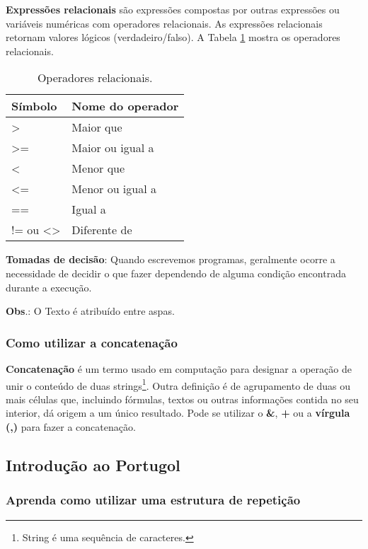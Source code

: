 \documentclass[12pt,a4paper]{article}
\begin{document}
	\textbf{Expressões relacionais} são expressões compostas por outras expressões ou variáveis numéricas com operadores relacionais. As expressões relacionais retornam valores lógicos (verdadeiro/falso). A Tabela \ref{tab:OperadoresRelacionais} mostra os operadores relacionais.
	
	\begin{table}[!htpb]
		\centering
		\begin{tabular}{|p{}|p{}|}%
			\hline
			Símbolo & Nome do operador \\
			\hline
			> & Maior que \\
			\hline
			>= & Maior ou igual a \\
			\hline
			< & Menor que \\
			\hline
			<= & Menor ou igual a \\
			\hline
			== & Igual a \\
			\hline
			!= ou <> & Diferente de \\
			\hline
		\end{tabular}
		\caption{Operadores relacionais.}
		\label{tab:OperadoresRelacionais}
	\end{table}
	
	\textbf{Tomadas de decisão}: Quando escrevemos programas, geralmente ocorre a necessidade de decidir o que fazer dependendo de alguma condição encontrada durante a execução.
	
	\textbf{Obs}.: O Texto é atribuído entre aspas.
	
	\subsubsection{Como utilizar a concatenação}
	
	\textbf{Concatenação} é um termo usado em computação para designar a operação de unir o conteúdo de duas strings\footnote{String é uma sequência de caracteres.}. Outra definição é de agrupamento de duas ou mais células que, incluindo fórmulas, textos ou outras informações contida no seu interior, dá origem a um único resultado. Pode se utilizar o \textbf{\&}, \textbf{+} ou a \textbf{vírgula (,)} para fazer a concatenação.
	
	
	\subsection{Introdução ao Portugol}
	
	\subsubsection{Aprenda como utilizar uma estrutura de repetição}
	
\end{document}
